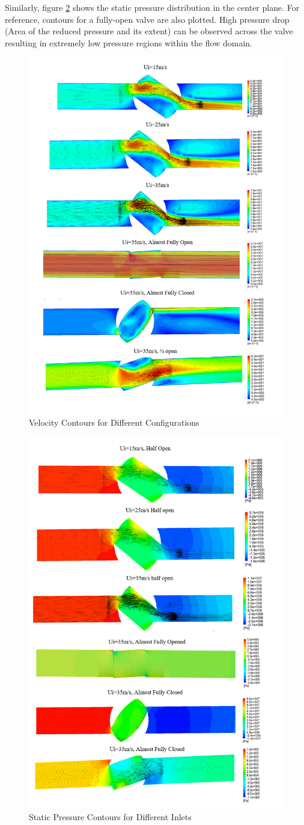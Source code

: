 \documentclass[]{article}
\begin{document}
Similarly, figure \ref{fig:pressure} shows the static pressure distribution in the center plane. For reference, contours for a fully-open valve are also plotted. High pressure drop (Area of the reduced pressure and its extent) can be observed across the valve resulting in extremely low pressure regions within the flow domain. 
\begin{figure}
	\centering
	\includegraphics[width=0.7\linewidth]{Photos/Velocity}
	\caption{Velocity Contours for Different Configurations}
	\label{fig:velocity}
\end{figure}

\begin{figure}
	\centering
	\includegraphics[width=0.7\linewidth]{Photos/Pressure}
	\caption{Static Pressure Contours for Different Inlets}
	\label{fig:pressure}
\end{figure}
\end{document}
